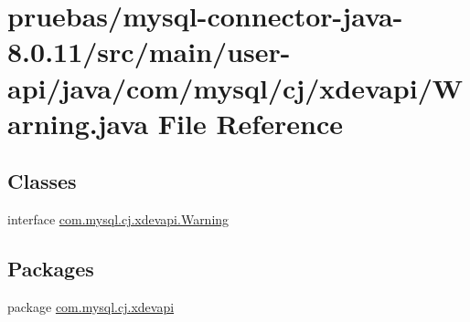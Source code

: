 \hypertarget{user-api_2java_2com_2mysql_2cj_2xdevapi_2_warning_8java}{}\section{pruebas/mysql-\/connector-\/java-\/8.0.11/src/main/user-\/api/java/com/mysql/cj/xdevapi/\+Warning.java File Reference}
\label{user-api_2java_2com_2mysql_2cj_2xdevapi_2_warning_8java}
\subsection*{Classes}
\begin{DoxyCompactItemize}
\item 
interface \mbox{\hyperlink{interfacecom_1_1mysql_1_1cj_1_1xdevapi_1_1_warning}{com.\+mysql.\+cj.\+xdevapi.\+Warning}}
\end{DoxyCompactItemize}
\subsection*{Packages}
\begin{DoxyCompactItemize}
\item 
package \mbox{\hyperlink{namespacecom_1_1mysql_1_1cj_1_1xdevapi}{com.\+mysql.\+cj.\+xdevapi}}
\end{DoxyCompactItemize}
